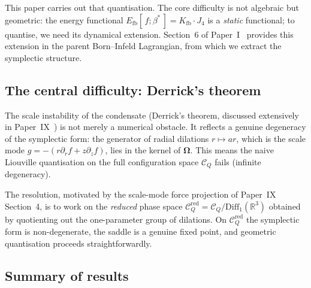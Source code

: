 \documentclass[11pt,a4paper]{article}
\theoremstyle{definition}
\theoremstyle{remark}
\newcommand{\bst}{\beta^{*}}
\newcommand{\Kfb}{K_{\mathrm{fb}}}
\newcommand{\Efb}{E_{\mathrm{fb}}}
\newcommand{\Jfour}{J_{4}}
\newcommand{\RR}{\mathbb{R}}
\newcommand{\CQ}{\mathcal{C}_Q}
\newcommand{\CQr}{\mathcal{C}_Q^{\mathrm{red}}}
\newcommand{\bOmega}{\boldsymbol{\Omega}}
\begin{document}
This paper carries out that quantisation.
The core difficulty is not algebraic but geometric: the energy functional
$\Efb[\,f;\bst\,] = \Kfb\cdot\Jfour$ is a \emph{static} functional;
to quantise, we need its dynamical extension.
Section~6 of Paper~I~\cite{Paper1} provides this extension in the
parent Born--Infeld Lagrangian, from which we extract the symplectic
structure.

\subsection{The central difficulty: Derrick's theorem}
\label{P10:sec:derrick_intro}

The scale instability of the condensate (Derrick's theorem, discussed
extensively in Paper~IX~\cite{Paper9}) is not merely a numerical
obstacle.
It reflects a genuine degeneracy of the symplectic form: the generator
of radial dilations $r\mapsto ar$, which is the scale mode
$g = -(r\partial_r f + z\partial_z f)$, lies in the kernel of
$\bOmega$.
This means the naive Liouville quantisation on the full
configuration space $\CQ$ fails (infinite degeneracy).

The resolution, motivated by the scale-mode force projection of
Paper~IX Section~4, is to work on the \emph{reduced} phase space
$\CQr = \CQ/\mathrm{Diff}_1(\RR^3)$ obtained by quotienting out the
one-parameter group of dilations.
On $\CQr$ the symplectic form is non-degenerate, the saddle is a
genuine fixed point, and geometric quantisation proceeds
straightforwardly.

\subsection{Summary of results}
\end{document}
